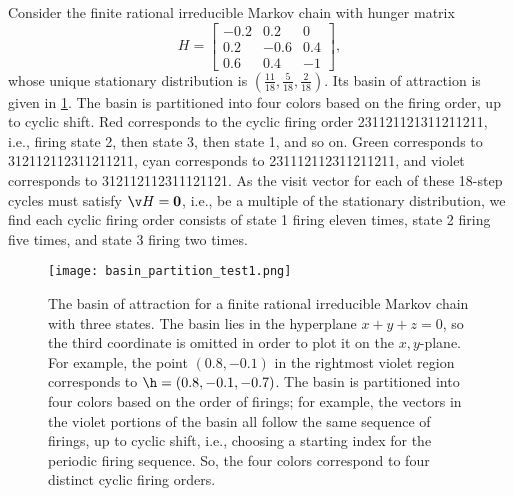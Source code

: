 \begin{example}\label{example: basin of attraction 1}
Consider the finite rational irreducible Markov chain with hunger matrix
\[ H = \begin{bmatrix} -0.2 & 0.2 & 0 \\ 0.2 & -0.6 & 0.4 \\ 0.6 & 0.4 & -1 \end{bmatrix},\]
whose unique stationary distribution is $\left(\frac{11}{18},\frac{5}{18},\frac{2}{18}\right)$.
Its basin of attraction is given in \cref{fig: basin of attraction 1}.
The basin is partitioned into four colors based on the firing order, up to cyclic shift.
Red corresponds to the cyclic firing order 231121121311211211, i.e., firing state 2, then state 3, then state 1, and so on.
Green corresponds to 312112112311211211, cyan corresponds to 231112112311211211, and violet corresponds to 312112112311121121.
As the visit vector for each of these 18-step cycles must satisfy $\v H = \mathbf{0}$, i.e., be a multiple of the stationary distribution, we find each cyclic firing order consists of state 1 firing eleven times, state 2 firing five times, and state 3 firing two times.
\begin{figure}[htb]
    \centering
    \texttt{[image: basin\_partition\_test1.png]}
    \caption{The basin of attraction for a finite rational irreducible Markov chain with three states.
    The basin lies in the hyperplane $x + y + z = 0$, so the third coordinate is omitted in order to plot it on the $x,y$-plane.
    For example, the point $(0.8,-0.1)$ in the rightmost violet region corresponds to $\h = (0.8,-0.1,-0.7)$.
    The basin is partitioned into four colors based on the order of firings; for example, the vectors in the violet portions of the basin all follow the same sequence of firings, up to cyclic shift, i.e., choosing a starting index for the periodic firing sequence.
    So, the four colors correspond to four distinct cyclic firing orders.}
    \label{fig: basin of attraction 1}
\end{figure}
\end{example}

